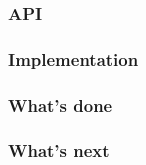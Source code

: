 \documentclass{beamer}
\title{}
\author{Tým }
\institute{Matematicko-fyzikální fakulta, Univerzita Karlova}
\date{\today}
\begin{document}

\begin{frame}
	\titlepage
\end{frame}

\begin{frame}
	\frametitle{API}
\end{frame}

\begin{frame}
	\frametitle{Implementation}
\end{frame}

\begin{frame}
	\frametitle{What's done}
\end{frame}

\begin{frame}
	\frametitle{What's next}
\end{frame}
\end{document}
